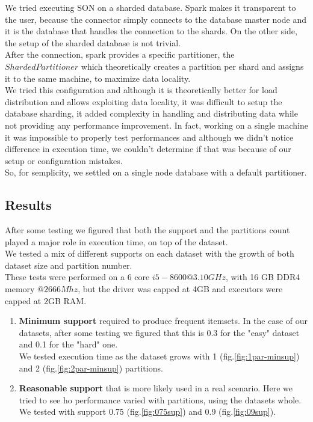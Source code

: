 \documentclass[a4paper]{article}
\begin{document}
	We tried executing SON on a sharded database. Spark makes it transparent to the user, because the connector simply connects to the database master node and it is the database that handles the
	connection to the shards. On the other side, the setup of the sharded database is not trivial.\\
	After the connection, spark provides a specific partitioner, the $ShardedPartitioner$ which theoretically creates a partition per shard and assigns it to the same machine, to maximize data locality.\\

	We tried this configuration and although it is theoretically better for load distribution and allows exploiting data locality, it was difficult to setup the database sharding, it added complexity 
	in handling and distributing data while not providing any performance improvement. 
	In fact, working on a single machine it was impossible to properly test performances and although we didn't notice difference in execution time, we couldn't determine if that was because of our 
	setup or configuration mistakes.\\
	So, for semplicity, we settled on a single node database with a default partitioner.\\


	\subsection{Results}
	\label{section:results}
	After some testing we figured that both the support and the partitions count played a major role in execution time, on top of the dataset.\\
	We tested a mix of different supports on each dataset with the growth of both dataset size and partition number.\\

	These tests were performed on a 6 core $i5-8600 @3.10GHz$, with 16 GB DDR4 memory $@2666Mhz$, but the driver was capped at 4GB and executors were capped at 2GB RAM.
	\begin{enumerate}
		\item \textbf{Minimum support} required to produce frequent itemsets. In the case of our datasets, after some testing we figured that this is 0.3 for the "easy" dataset and 0.1 for the "hard" one.\\
		We tested execution time as the dataset grows with 1 (fig.\ref{fig:1par-minsup}) and 2 (fig.\ref{fig:2par-minsup}) partitions.
		\item \textbf{Reasonable support} that is more likely used in a real scenario. Here we tried to see ho performance varied with partitions, using the datasets whole.\\
		We tested with support 0.75 (fig.\ref{fig:075sup}) and 0.9 (fig.\ref{fig:09sup}).
	\end{enumerate}
\end{document}
